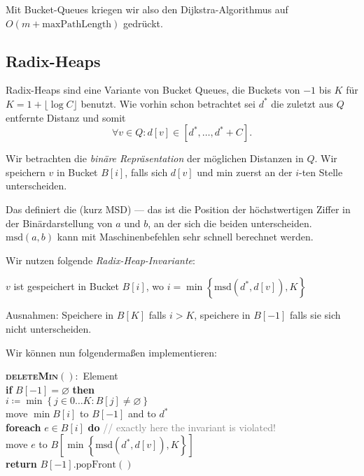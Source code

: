 Mit Bucket-Queues kriegen wir also den Dijkstra-Algorithmus auf \( O(m+\text{maxPathLength}) \) gedrückt.

\subsection{Radix-Heaps}

Radix-Heaps sind eine Variante von Bucket Queues, die Buckets von \( -1 \) bis \( K \) für \( K = 1 + \lfloor \log C \rfloor \) benutzt. Wie vorhin schon betrachtet sei \( d^{*} \) die zuletzt aus \( Q \) entfernte Distanz und somit
\begin{equation*}
  \forall v \in Q : d[v] \in [d^{*},\dots,d^{*}+C]\text{.}
\end{equation*}

Wir betrachten die \emph{binäre Repräsentation} der möglichen Distanzen in \( Q \). Wir speichern \( v \) in Bucket \( B[i] \), falls sich \( d[v] \) und min zuerst an der \( i \)-ten Stelle unterscheiden.

Das definiert die  (kurz MSD) --- das ist die Position der höchstwertigen Ziffer in der Binärdarstellung von \( a \) und \( b \), an der sich die beiden unterscheiden. \( \text{msd}(a,b) \) kann mit Maschinenbefehlen sehr schnell berechnet werden.

Wir nutzen folgende \emph{Radix-Heap-Invariante}:

\begin{center}
  \( v \) ist gespeichert in Bucket \( B[i] \), wo \( i = \min\left \{ \text{msd}(d^{*},d[v]),K \right \} \)
\end{center}

Ausnahmen: Speichere in \( B[K] \) falls \( i > K \), speichere in \( B[-1] \) falls sie sich nicht unterscheiden.

Wir können nun  folgendermaßen implementieren:

\begin{pseudocode}
  \textbf{\textsc{deleteMin}}\( () : \) Element \\
  \textbf{if} \( B[-1] = \varnothing \) \textbf{then} \\
  \phantom{\enskip} \( i \coloneqq \min\left \{ j \in 0\dots K : B[j] \neq \varnothing \right \} \) \\
  \phantom{\enskip} move \( \min B[i] \) to \( B[-1] \) and to \( d^{*} \) \\
  \phantom{\enskip} \textbf{foreach} \( e \in B[i] \) \textbf{do} \enskip{} \textcolor{gray}{// exactly here the invariant is violated!} \\
  \phantom{\enskip} \phantom{\enskip} move \( e \) to \( B[\min\left \{ \text{msd}(d^{*}, d[v]), K \right \}] \) \\
  \textbf{return} \( B[-1]\text{.popFront}() \)
\end{pseudocode}

